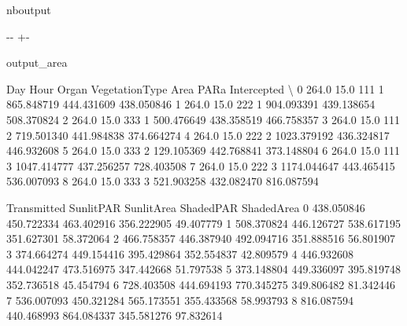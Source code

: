\documentclass[letterpaper,10pt,english]{sphinxmanual}
\begin{document}
\begin{sphinxuseclass}{nboutput}
{

\kern-\sphinxverbatimsmallskipamount\kern-\baselineskip
\kern+\FrameHeightAdjust\kern-\fboxrule
\vspace{\nbsphinxcodecellspacing}

\begin{sphinxuseclass}{output_area}
\begin{sphinxuseclass}{}


\begin{sphinxVerbatim}[commandchars=\\\{\}]
     Day  Hour  Organ  VegetationType         Area        PARa  Intercepted  \textbackslash{}
0  264.0  15.0    111               1   865.848719  444.431609   438.050846
1  264.0  15.0    222               1   904.093391  439.138654   508.370824
2  264.0  15.0    333               1   500.476649  438.358519   466.758357
3  264.0  15.0    111               2   719.501340  441.984838   374.664274
4  264.0  15.0    222               2  1023.379192  436.324817   446.932608
5  264.0  15.0    333               2   129.105369  442.768841   373.148804
6  264.0  15.0    111               3  1047.414777  437.256257   728.403508
7  264.0  15.0    222               3  1174.044647  443.465415   536.007093
8  264.0  15.0    333               3   521.903258  432.082470   816.087594

   Transmitted   SunlitPAR  SunlitArea   ShadedPAR  ShadedArea
0   438.050846  450.722334  463.402916  356.222905   49.407779
1   508.370824  446.126727  538.617195  351.627301   58.372064
2   466.758357  446.387940  492.094716  351.888516   56.801907
3   374.664274  449.154416  395.429864  352.554837   42.809579
4   446.932608  444.042247  473.516975  347.442668   51.797538
5   373.148804  449.336097  395.819748  352.736518   45.454794
6   728.403508  444.694193  770.345275  349.806482   81.342446
7   536.007093  450.321284  565.173551  355.433568   58.993793
8   816.087594  440.468993  864.084337  345.581276   97.832614
\end{sphinxVerbatim}



\end{sphinxuseclass}
\end{sphinxuseclass}
}

\end{sphinxuseclass}
\end{document}
